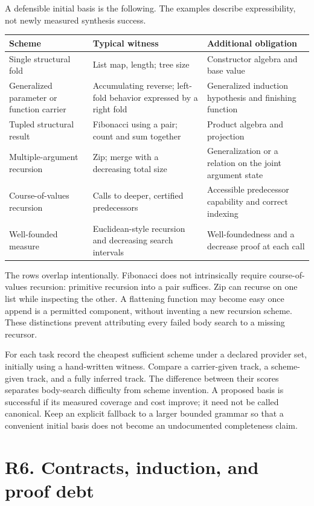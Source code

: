 \documentclass[11pt,a4paper]{article}
\theoremstyle{definition}
\theoremstyle{remark}
\begin{document}
A defensible initial basis is the following. The examples describe expressibility,
not newly measured synthesis success.
\begin{longtable}{@{}L{33mm}L{56mm}L{59mm}@{}}
\toprule
Scheme & Typical witness & Additional obligation\\
\midrule\endhead
Single structural fold & List map, length; tree size & Constructor algebra and
base value\\
Generalized parameter or function carrier & Accumulating reverse; left-fold
behavior expressed by a right fold & Generalized induction hypothesis and
finishing function\\
Tupled structural result & Fibonacci using a pair; count and sum together &
Product algebra and projection\\
Multiple-argument recursion & Zip; merge with a decreasing total size &
Generalization or a relation on the joint argument state\\
Course-of-values recursion & Calls to deeper, certified predecessors &
Accessible predecessor capability and correct indexing\\
Well-founded measure & Euclidean-style recursion and decreasing search intervals &
Well-foundedness and a decrease proof at each call\\
\bottomrule
\end{longtable}
The rows overlap intentionally. Fibonacci does not intrinsically require
course-of-values recursion: primitive recursion into a pair suffices. Zip can
recurse on one list while inspecting the other. A flattening function may become
easy once append is a permitted component, without inventing a new recursion
scheme. These distinctions prevent attributing every failed body search to a
missing recursor.

For each task record the cheapest sufficient scheme under a declared provider
set, initially using a hand-written witness. Compare a carrier-given track, a
scheme-given track, and a fully inferred track. The difference between their
scores separates body-search difficulty from scheme invention. A proposed basis
is successful if its measured coverage and cost improve; it need not be called
canonical. Keep an explicit fallback to a larger bounded grammar so that a
convenient initial basis does not become an undocumented completeness claim.

\section{R6. Contracts, induction, and proof debt}
\label{sec:r6}
\end{document}
